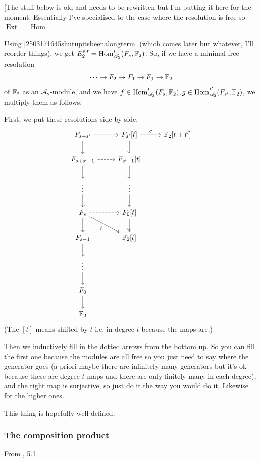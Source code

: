 \documentclass{MetricNotes2023}
\def\bb{\ensuremath\mathbb}
\def\A{\ensuremath{\mathscr{A}_2}}
\DeclareMathOperator{\Ext}{Ext}
\DeclareMathOperator{\Hom}{Hom}
\begin{document}
[The stuff below is old and needs to be rewritten but I'm putting it here for the moment. Essentially I've specialised to the case  where the resolution is free so \(\Ext=\Hom\).]

Using \ref{2503171645shutupitsbeenalongterm} (which comes later but whatever, I'll reorder things), we get \(E_2^{s,t}=\Hom^t_{\A}(F_s, \bb{F}_2)\). So, if we have a minimal free resolution 
\[\cdots \to F_2 \to F_1 \to F_0 \to \bb{F}_2\]
of \(\bb{F}_2\) as an \(\A\)-module, and we have \(f \in \Hom^t_{\A}(F_s, \bb{F}_2), g \in \Hom^{t'}_{\A}(F_{s'}, \bb{F}_2)\), we multiply them as follows:

First, we put these resolutions side by side.
\[\begin{tikzcd}
F_{s+s'} \arrow[r, dashrightarrow,""] \arrow[d, swap, ""]  & F_{s'}[t]  \arrow[d, ""] \arrow[r, "g"] & \bb{F}_2[t+t']  \\
F_{s+s'-1} \arrow[r, dashrightarrow, ""] \arrow[d, ""] & F_{s'-1}[t] \arrow[d, ""] & \\
\vdots \arrow[d, ""] & \vdots \arrow[d, ""] &   \\
F_s \arrow[r, dashrightarrow, ""] \arrow[d, ""] \arrow[rd, "f"'] & F_0[t]  \arrow[d, twoheadrightarrow, ""] &   \\ 
F_{s-1} \arrow[d] & \bb{F}_2[t] & \\
\vdots \arrow[d] & & \\
F_0  \arrow[d] & & \\
\bb{F}_2 & & 
\end{tikzcd}\]
(The \([t]\) means shifted by \(t\) i.e. in degree \(t\) because the maps are.)

Then we inductively fill in the dotted arrows from the bottom up. So you can fill the first one because the modules are all free so you just need to say where the generator goes (a priori maybe there are infinitely many generators but it's ok because these are degree \(t\) maps and there are only finitely many in each degree), and the right map is surjective, so just do it the way you would do it. Likewise for the higher ones. 

This thing is hopefully well-defined.

\subsubsection{The composition product}

From \autocite{ass}, 5.1
\end{document}
